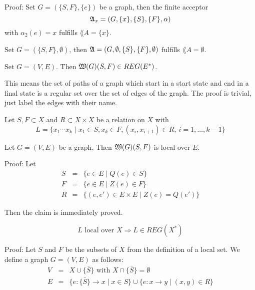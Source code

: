Proof: Set $G = (\{S,F\}, \{e\})$ be a graph, then the finite acceptor
\[\mbox{$\mathfrak{A}$}_x = (G, \{x\}, \{S\}, \{F\}, \alpha)\] with $\alpha_2(e) = x$ fulfills
$\lang{A} = \{x\}$.

Set $G = (\{S,F\}, \emptyset)$, then $\mbox{$\mathfrak{A}$} = (G, \emptyset, \{S\}, \{F\},
\emptyset)$ fulfills $\lang{A} = \emptyset$.

\begin{lemma}
Set $G = (V, E)$. Then $\mbox{$\mathfrak{W}(G)$}(S,F) \in REG(E^*)$.
\end{lemma}

This means the set of paths of a graph which start in a start state and end in a
final state is a regular set over the set of edges of the graph. The proof is
trivial, just label the edges with their name.

\begin{definition}
Let $S, F \subset X$ and $R \subset X \times X$ be a relation on $X$ with \[ L =
\{ x_1 \cdots x_k \mid x_1 \in S, x_k \in F, (x_i, x_{i+1}) \in R,\ i = 1,
\ldots, k - 1 \} \]
\end{definition}

\begin{lemma}
Let $G = (V, E)$ be a graph. Then $\mbox{$\mathfrak{W}(G)$}(S, F)$ is local over $E$.
\end{lemma}

Proof: Let \begin{eqnarray*}
S & = & \{ e \in E \mid Q(e) \in S \} \\ 
F & = & \{ e \in E \mid Z(e) \in F \} \\
R & = & \{ (e, e') \in E \times E \mid Z(e) = Q(e') \} 
\end{eqnarray*}

Then the claim is immediately proved.

\begin{lemma}
\[ L \mbox{ local over } X \Rightarrow L \in REG(X^*) \]
\end{lemma}

Proof: Let $S$ and $F$ be the subsets of $X$ from the definition of a local
set. We define a graph $G = (V, E)$ as follows:
\begin{eqnarray*}
V & = & X \cup \{ \bar{S} \} \mbox{ with } X \cap \{ \bar{S} \} = \emptyset \\
E & = & \{ e : \{ \bar{S} \} \to x \mid x \in S \} \cup \{ e : x \to y \mid
(x, y) \in R \}
\end{eqnarray*}


